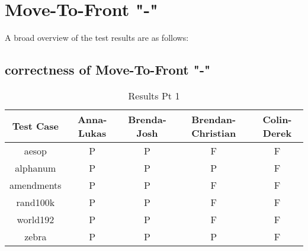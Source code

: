 \documentclass[12pt]{article}
\begin{document}

\newcommand{\hmwkClass}{COS 423}
\newcommand{\hmwkSemester}{Spring 2013}

\newcommand{\hmwkAuthorName}{Rafael Zuniga}
\newcommand{\hmwkAuthorID}{rzuniga}

\newcommand{\hmwkAssignmentNum}{0}

\newcommand{\hmwkProblemNum}{1}

\newcommand{\hmwkCollaborators}{Parker Watts}
\thispagestyle{fancycollab}








\section{Move-To-Front "-"}
A broad overview of the test results are as follows:
\subsection{correctness of Move-To-Front "-"}

\begin{table}[ht]
\caption{Results Pt 1}%
\centering %
\begin{tabular}{c c c c c}%
\hline \hline                        %
Test Case & Anna-Lukas & Brenda-Josh & Brendan-Christian & Colin-Derek \\ [0.5ex]%
\hline                  %
aesop & P & P & F & F \\  %
alphanum & P & P & P & F \\
amendments & P & P & F & F \\
rand100k & P & P & F & F \\
world192 & P & P & F & F \\
zebra & P & P & P & F \\
\hline                  %
\end{tabular}
\label{table:nonlin}
\end{table}
\end{document}
